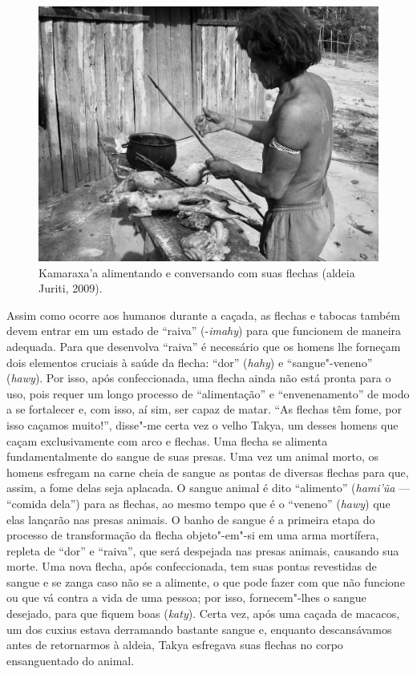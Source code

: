 \begin{figure}[!hb]
\centering
  \includegraphics[width=\textwidth]{./imgs/100_5107}
\caption{Kamaraxa’a alimentando e conversando com suas flechas (aldeia Juriti, 2009).}
\end{figure}

Assim como ocorre aos humanos durante a caçada, as flechas e tabocas
também devem entrar em um estado de ``raiva'' (-\emph{imahy}) para que
funcionem de maneira adequada. Para que desenvolva ``raiva'' é necessário
que os homens lhe forneçam dois elementos cruciais à saúde da flecha:
``dor'' (\emph{hahy}) e ``sangue"-veneno'' (\emph{hawy}). Por isso, após
confeccionada, uma flecha ainda não está pronta para o uso, pois requer
um longo processo de ``alimentação'' e ``envenenamento'' de modo a se
fortalecer e, com isso, aí sim, ser capaz de matar. ``As flechas têm
fome, por isso caçamos muito!'', disse"-me certa vez o velho Takya, um
desses homens que caçam exclusivamente com arco e flechas. Uma flecha se
alimenta fundamentalmente do sangue de suas presas. Uma vez um animal
morto, os homens esfregam na carne cheia de sangue as pontas de diversas
flechas para que, assim, a fome delas seja aplacada. O sangue animal é
dito ``alimento'' (\emph{hami'ũa} --- ``comida dela'') para as flechas, ao
mesmo tempo que é o ``veneno'' (\emph{hawy}) que elas lançarão nas presas
animais. O banho de sangue é a primeira etapa do processo de
transformação da flecha objeto"-em"-si em uma arma mortífera, repleta de
``dor'' e ``raiva'', que será despejada nas presas animais, causando sua
morte. Uma nova flecha, após confeccionada, tem suas pontas revestidas
de sangue e se zanga caso não se a alimente, o que pode fazer com que
não funcione ou que vá contra a vida de uma pessoa; por isso,
fornecem"-lhes o sangue desejado, para que fiquem boas (\emph{katy}).
Certa vez, após uma caçada de macacos, um dos cuxius estava derramando
bastante sangue e, enquanto descansávamos antes de retornarmos à aldeia,
Takya esfregava suas flechas no corpo ensanguentado do animal.

